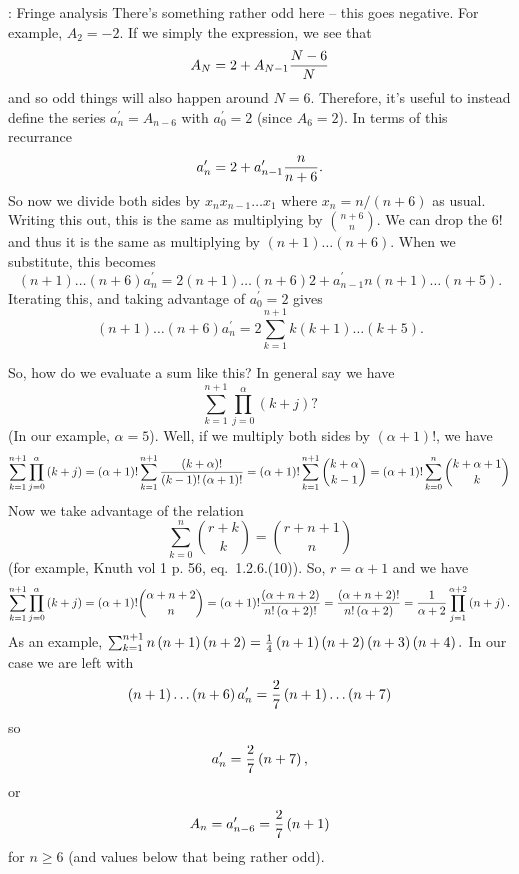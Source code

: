 \vskip 0.08in : Fringe analysis\hfil\break
There's something rather odd here -- this goes negative.  For example,
$A_2 = -2$.  If we simply the expression, we see that
$$
 A_N = 2 + A_{N-1} {N - 6 \over N}
$$
and so odd things will also happen around $N = 6$.  Therefore, it's
useful to instead define the series $a^{\prime}_n = A_{n-6}$ with
$a^{\prime}_0 = 2$ (since $A_6 = 2$).  In terms of this recurrance
$$
 a^{\prime}_n = 2 + a^{\prime}_{n-1} {n \over n + 6}.
$$
So now we divide both sides by $x_n x_{n-1} \ldots x_1$ where
$x_n = n / \left(n + 6\right)$ as usual.  Writing this out, this is 
the same as multiplying by $n + 6 \choose n$.  We can drop the $6!$
and thus it is the same as multiplying by $\left(n + 1\right)\ldots\left(n+6\right)$.
When we substitute, this becomes
$$
 \left(n+1\right)\ldots\left(n+6\right) a^{\prime}_n = 2 \left(n+1\right)\ldots
 \left(n+6\right) 2 + a^{\prime}_{n-1} n \left(n+1\right)\ldots\left(n+5\right).
$$
Iterating this, and taking advantage of $a^{\prime}_0 = 2$ gives
$$
\left(n+1\right)\ldots\left(n+6\right) a^{\prime}_n = 2 \sum_{k=1}^{n+1}
k \left(k + 1\right)\ldots\left(k+5\right).
$$

So, how do we evaluate a sum like this?  In general say we have
$$
 \sum_{k=1}^{n+1} \prod_{j=0}^{\alpha} \left(k + j\right)?
$$
(In our example, $\alpha = 5$).  Well, if we multiply both sides by 
$\left(\alpha + 1\right) !$, we have
$$
 \sum_{k=1}^{n+1} \prod_{j=0}^{\alpha} \left(k + j\right) =
 \left(\alpha + 1\right)! \sum_{k=1}^{n+1} {\left(k + \alpha\right)!
   \over \left(k - 1\right)! \left(\alpha + 1\right)!} =
    \left(\alpha + 1\right)! \sum_{k=1}^{n+1} {k + \alpha \choose k - 1}
     = \left(\alpha + 1\right)! \sum_{k=0}^{n} {k + \alpha + 1 \choose k}
$$
Now we take advantage of the relation
$$
 \sum_{k=0}^n {r + k \choose k} = {r + n + 1 \choose n}
$$
(for example, Knuth vol 1 p. 56, eq.~1.2.6.(10)).  So, $r=\alpha + 1$
and we have
$$
  \sum_{k=1}^{n+1} \prod_{j=0}^{\alpha} \left(k + j\right) =
  \left(\alpha + 1\right)! {\alpha + n + 2 \choose n} =
  \left(\alpha + 1\right)! {\left(\alpha + n + 2\right) \over n! \left(\alpha + 2\right)!} =
  { \left(\alpha + n + 2\right)! \over n! \left(\alpha + 2\right)}
  = {1 \over \alpha + 2} \prod_{j=1}^{\alpha + 2} \left(n + j\right).
$$
As an example, $\sum_{k=1}^{n+1} n \left(n + 1\right) \left(n + 2\right)
 = {1 \over 4} \left(n + 1\right)\left(n + 2\right) \left(n + 3\right) \left(n + 4\right).$
 In our case we are left with
$$
\left(n+1\right)\ldots\left(n+6\right) a^{\prime}_n = {2 \over 7}
\left(n + 1\right) \ldots \left(n + 7\right)
$$
so
$$ 
 a^{\prime}_n = {2 \over 7} \left(n + 7\right),
$$
or
$$
 A_n = a^{\prime}_{n-6} = {2 \over 7} \left(n + 1\right)
$$
for $n \ge 6$ (and values below that being rather odd).

